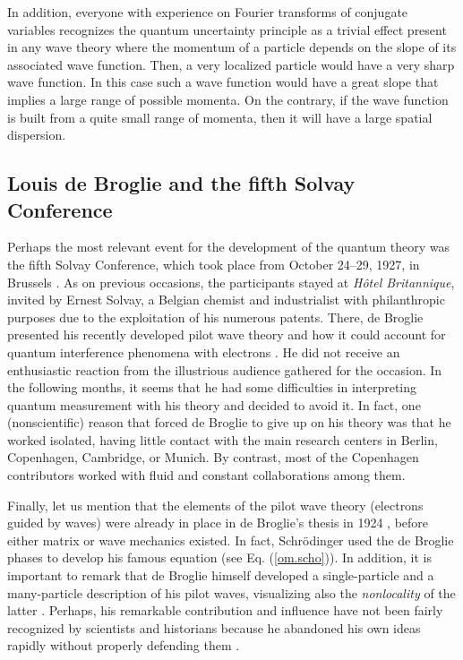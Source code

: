 \documentclass[onecolumn,nofootinbib, secnumarabic, amsmath, nobibnotes,11pt,aps,pra]{revtex4-1}
\newcommand{\eref}[1]{Eq. (\ref{#1})}
\begin{document}
In addition, everyone with experience on Fourier transforms of
conjugate variables recognizes the quantum uncertainty principle as
a trivial effect present in any wave theory where the momentum of a
particle depends on the slope of its associated wave function. Then,
a very localized particle would have a very sharp wave function.
In this case such a wave function would have a great slope that implies
a large range of possible momenta. On the contrary, if the wave
function is built from a quite small range of momenta, then it will
have a large spatial dispersion.


\subsection{Louis de Broglie and the fifth Solvay Conference}\label{om.sec_intro.5}

Perhaps the most relevant event for the development of the quantum
theory was the fifth Solvay Conference, which took place from
October 24--29, 1927, in Brussels \cite{om.valentini2009Solvay}. As
on previous occasions, the participants stayed at \textit{H\^{o}tel
Britannique}, invited by Ernest Solvay, a Belgian chemist and
industrialist with philanthropic purposes due to the exploitation of
his numerous patents. There, de Broglie presented his recently
developed pilot wave theory and how it could account for quantum
interference phenomena with electrons \cite{om.valentini2009Solvay}.
He did not receive an enthusiastic reaction from the illustrious
audience gathered for the occasion. In the following months, it
seems that he had some difficulties in interpreting quantum
measurement with his theory and decided to avoid it. In fact, one
(nonscientific) reason that forced de Broglie to give up on his
theory was that he worked isolated, having little contact with the
main research centers in Berlin, Copenhagen, Cambridge, or Munich.
By contrast, most of the Copenhagen contributors worked with fluid
and constant collaborations among them.

Finally, let us mention that the elements of the pilot wave theory
(electrons guided by waves) were already in place in de Broglie's
thesis in 1924 \cite{om.debroglie1923}, before either matrix or wave
mechanics existed. In fact, Schr\"odinger used the de Broglie phases
to develop his famous equation (see \eref{om.scho}). In addition, it
is important to remark that de Broglie himself developed a
single-particle and a many-particle description of his pilot waves,
visualizing also the \textit{nonlocality} of the latter
\cite{om.valentini2009Solvay}. Perhaps, his remarkable contribution
and influence have not been fairly recognized by scientists and
historians because he abandoned his own ideas rapidly without properly
defending them \cite{om.valentini2009Solvay,om.Broglie1956}.
\end{document}
